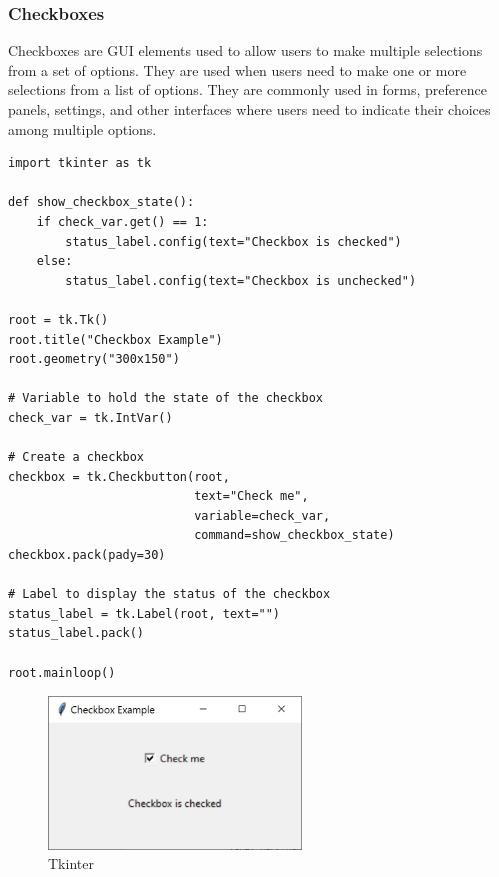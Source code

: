 \subsubsection{Checkboxes}
Checkboxes are GUI elements used to allow users to make multiple selections from a set of options. They are used when users need to make one or more selections from a list of options. They are commonly used in forms, preference panels, settings, and other interfaces where users need to indicate their choices among multiple options.

\begin{codebox}
\begin{verbatim}
import tkinter as tk

def show_checkbox_state():
    if check_var.get() == 1:
        status_label.config(text="Checkbox is checked")
    else:
        status_label.config(text="Checkbox is unchecked")

root = tk.Tk()
root.title("Checkbox Example")
root.geometry("300x150")

# Variable to hold the state of the checkbox
check_var = tk.IntVar()

# Create a checkbox
checkbox = tk.Checkbutton(root, 
                          text="Check me", 
                          variable=check_var, 
                          command=show_checkbox_state)
checkbox.pack(pady=30)

# Label to display the status of the checkbox
status_label = tk.Label(root, text="")
status_label.pack()

root.mainloop()
\end{verbatim}
\end{codebox}

\begin{figure}[h]
    \centering
    \includegraphics[width=0.6\textwidth]{images/checkbox.JPG}
    \caption{Tkinter}
    \label{fig:checkbox}
\end{figure}


